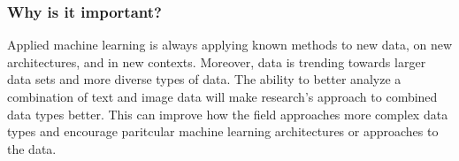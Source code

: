 \subsubsection{Why is it important?}

Applied machine learning is always applying known methods to new data, on new architectures, and in new contexts.  Moreover, data is trending towards larger data sets and more diverse types of data.  The ability to better analyze a combination of text and image data will make research's approach to combined data types better.  This can improve how the field approaches more complex data types and encourage paritcular machine learning architectures or approaches to the data.




